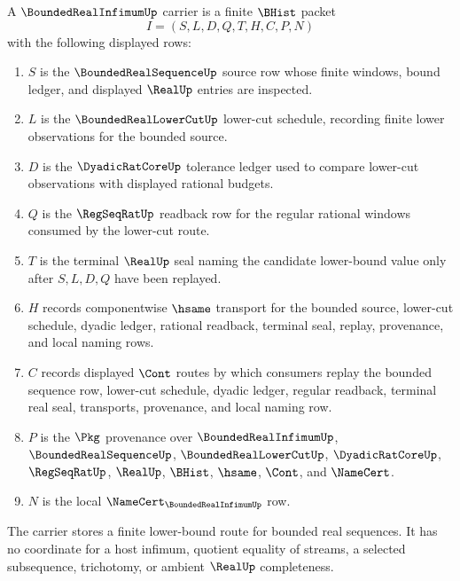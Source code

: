 \begin{definition}
\label{def:bounded-real-infimum-carrier}
A $\BoundedRealInfimumUp$ carrier is a finite $\BHist$ packet
$$
I=(S,L,D,Q,T,H,C,P,N)
$$
with the following displayed rows:
\begin{enumerate}
\item $S$ is the $\BoundedRealSequenceUp$ source row whose finite windows, bound ledger, and displayed $\RealUp$ entries are inspected.
\item $L$ is the $\BoundedRealLowerCutUp$ lower-cut schedule, recording finite lower observations for the bounded source.
\item $D$ is the $\DyadicRatCoreUp$ tolerance ledger used to compare lower-cut observations with displayed rational budgets.
\item $Q$ is the $\RegSeqRatUp$ readback row for the regular rational windows consumed by the lower-cut route.
\item $T$ is the terminal $\RealUp$ seal naming the candidate lower-bound value only after $S,L,D,Q$ have been replayed.
\item $H$ records componentwise $\hsame$ transport for the bounded source, lower-cut schedule, dyadic ledger, rational readback, terminal seal, replay, provenance, and local naming rows.
\item $C$ records displayed $\Cont$ routes by which consumers replay the bounded sequence row, lower-cut schedule, dyadic ledger, regular readback, terminal real seal, transports, provenance, and local naming row.
\item $P$ is the $\Pkg$ provenance over $\BoundedRealInfimumUp$, $\BoundedRealSequenceUp$, $\BoundedRealLowerCutUp$, $\DyadicRatCoreUp$, $\RegSeqRatUp$, $\RealUp$, $\BHist$, $\hsame$, $\Cont$, and $\NameCert$.
\item $N$ is the local $\NameCert_{\BoundedRealInfimumUp}$ row.
\end{enumerate}
The carrier stores a finite lower-bound route for bounded real sequences. It has no coordinate for a host infimum, quotient equality of streams, a selected subsequence, trichotomy, or ambient $\RealUp$ completeness.
\end{definition}

